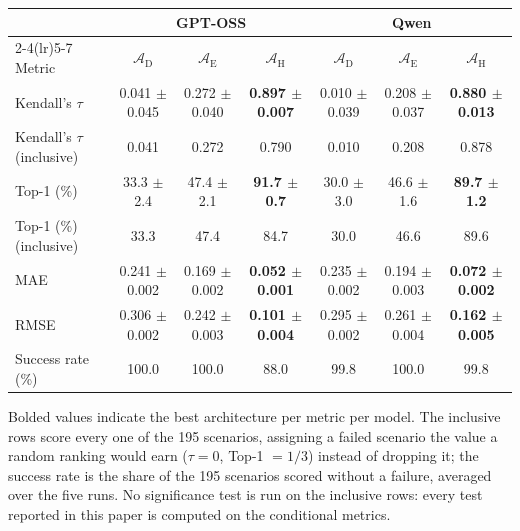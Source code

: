 \documentclass[11pt]{article}
\begin{document}
\begin{table}[htbp]
\begin{tabular}{lcccccc}
\toprule
 & \multicolumn{3}{c}{GPT-OSS} & \multicolumn{3}{c}{Qwen} \\
\cmidrule(lr){2-4}\cmidrule(lr){5-7}
Metric & $\mathcal{A}_{\text{D}}$ & $\mathcal{A}_{\text{E}}$ & $\mathcal{A}_{\text{H}}$ & $\mathcal{A}_{\text{D}}$ & $\mathcal{A}_{\text{E}}$ & $\mathcal{A}_{\text{H}}$ \\
\midrule
Kendall's $\tau$ & 0.041 $\pm$ 0.045 & 0.272 $\pm$ 0.040 & \textbf{0.897 $\pm$ 0.007} & 0.010 $\pm$ 0.039 & 0.208 $\pm$ 0.037 & \textbf{0.880 $\pm$ 0.013} \\
Kendall's $\tau$ (inclusive) & 0.041 & 0.272 & 0.790 & 0.010 & 0.208 & 0.878 \\
Top-1 (\%) & 33.3 $\pm$ 2.4 & 47.4 $\pm$ 2.1 & \textbf{91.7 $\pm$ 0.7} & 30.0 $\pm$ 3.0 & 46.6 $\pm$ 1.6 & \textbf{89.7 $\pm$ 1.2} \\
Top-1 (\%) (inclusive) & 33.3 & 47.4 & 84.7 & 30.0 & 46.6 & 89.6 \\
MAE & 0.241 $\pm$ 0.002 & 0.169 $\pm$ 0.002 & \textbf{0.052 $\pm$ 0.001} & 0.235 $\pm$ 0.002 & 0.194 $\pm$ 0.003 & \textbf{0.072 $\pm$ 0.002} \\
RMSE & 0.306 $\pm$ 0.002 & 0.242 $\pm$ 0.003 & \textbf{0.101 $\pm$ 0.004} & 0.295 $\pm$ 0.002 & 0.261 $\pm$ 0.004 & \textbf{0.162 $\pm$ 0.005} \\
Success rate (\%) & 100.0 & 100.0 & 88.0 & 99.8 & 100.0 & 99.8 \\
\bottomrule
\end{tabular}
\renewcommand{\arraystretch}{1.0}
\end{table}

Bolded values indicate the best architecture per metric per model. The inclusive rows score every one of the 195 scenarios, assigning a failed scenario the value a random ranking would earn ($\tau = 0$, Top-1 $= 1/3$) instead of dropping it; the success rate is the share of the 195 scenarios scored without a failure, averaged over the five runs. No significance test is run on the inclusive rows: every test reported in this paper is computed on the conditional metrics.



\end{document}
